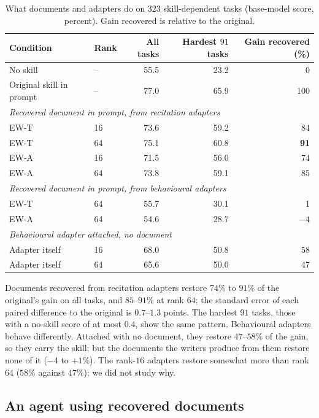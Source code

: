 \documentclass[11pt]{article}
\newcommand{\best}[1]{\textbf{#1}}
\newcommand{\EWT}{\textsc{EW-T}}
\newcommand{\EWA}{\textsc{EW-A}}
\begin{document}
\begin{table}[!htb]
\centering
\caption{What documents and adapters do on $323$ skill-dependent tasks (base-model score, percent). Gain recovered is relative to the original.}
\label{tab:beh-task}
\small
\setlength{\tabcolsep}{5pt}
\begin{tabular}{llrrr}
\toprule
Condition & Rank & All tasks & Hardest $91$ tasks & Gain recovered (\%)\\
\midrule
No skill & -- & 55.5 & 23.2 & 0\\
Original skill in prompt & -- & 77.0 & 65.9 & 100\\
\midrule
\multicolumn{5}{l}{\emph{Recovered document in prompt, from recitation adapters}}\\
\EWT{} & 16 & 73.6 & 59.2 & 84\\
\EWT{} & 64 & 75.1 & 60.8 & \best{91}\\
\EWA{} & 16 & 71.5 & 56.0 & 74\\
\EWA{} & 64 & 73.8 & 59.1 & 85\\
\midrule
\multicolumn{5}{l}{\emph{Recovered document in prompt, from behavioural adapters}}\\
\EWT{} & 64 & 55.7 & 30.1 & 1\\
\EWA{} & 64 & 54.6 & 28.7 & $-4$\\
\midrule
\multicolumn{5}{l}{\emph{Behavioural adapter attached, no document}}\\
Adapter itself & 16 & 68.0 & 50.8 & 58\\
Adapter itself & 64 & 65.6 & 50.0 & 47\\
\bottomrule
\end{tabular}
\end{table}

Documents recovered from recitation adapters restore $74\%$ to $91\%$ of the original's gain on all tasks, and $85$--$91\%$ at rank $64$; the
standard error of each paired difference to the original is $0.7$--$1.3$ points. The hardest $91$ tasks, those with a no-skill score of at most
$0.4$, show the same pattern. Behavioural adapters behave differently. Attached with no document, they restore $47$--$58\%$ of the gain, so they
carry the skill; but the documents the writers produce from them restore none of it ($-4$ to $+1\%$). The rank-$16$ adapters restore somewhat more than
rank $64$ ($58\%$ against $47\%$); we did not study why.

\subsection{An agent using recovered documents}
\label{sec:res-agent}
\end{document}

